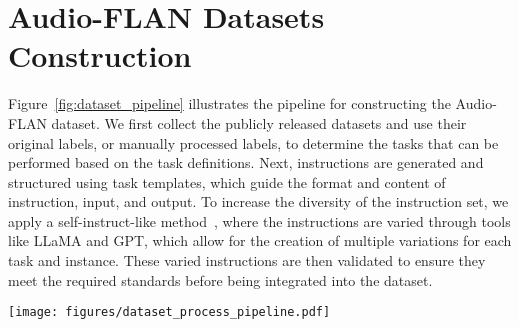 





\section{Audio-FLAN Datasets Construction}





Figure~\ref{fig:dataset_pipeline} illustrates the pipeline for constructing the Audio-FLAN dataset. We first collect the publicly released datasets and use their original labels, or manually processed labels, to determine the tasks that can be performed based on the task definitions. Next, instructions are generated and structured using task templates, which guide the format and content of instruction, input, and output. To increase the diversity of the instruction set, we apply a self-instruct-like method~\citep{wang2023self}, where the instructions are varied through tools like LLaMA and GPT, which allow for the creation of multiple variations for each task and instance. These varied instructions are then validated to ensure they meet the required standards before being integrated into the dataset.

\begin{figure*}[thbp]
\centering
\texttt{[image: figures/dataset\_process\_pipeline.pdf]}
\caption{Overview pipeline of Audio-FLAN dataset construction.}
\label{fig:dataset_pipeline}
\end{figure*}


